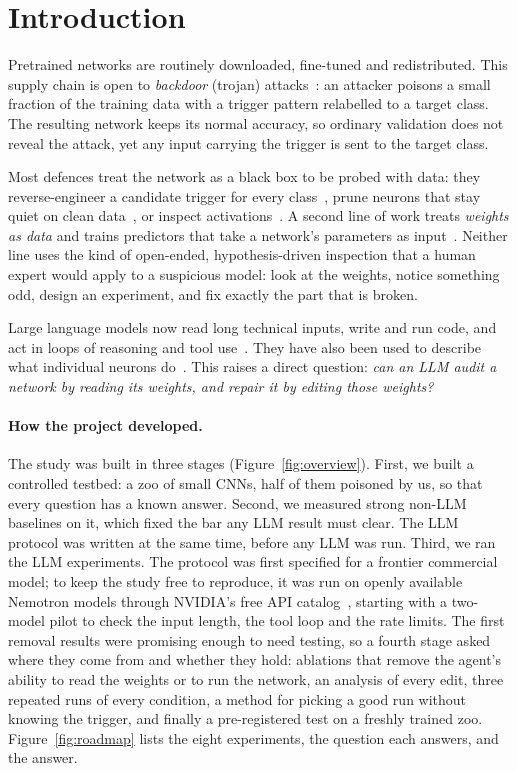 \documentclass[11pt]{article}
\begin{document}
\section{Introduction}
Pretrained networks are routinely downloaded, fine-tuned and redistributed. This supply chain is
open to \emph{backdoor} (trojan) attacks~\citep{gu2017badnets}: an attacker poisons a small fraction
of the training data with a trigger pattern relabelled to a target class. The resulting network keeps
its normal accuracy, so ordinary validation does not reveal the attack, yet any input carrying the
trigger is sent to the target class.

Most defences treat the network as a black box to be probed with data: they reverse-engineer a
candidate trigger for every class~\citep{wang2019neuralcleanse}, prune neurons that stay quiet on
clean data~\citep{liu2018fineprune}, or inspect activations~\citep{tran2018spectral}. A second line
of work treats \emph{weights as data} and trains predictors that take a network's parameters as
input~\citep{unterthiner2020predicting, schurholt2022modelzoos, navon2023equivariant, xu2021mntd}.
Neither line uses the kind of open-ended, hypothesis-driven inspection that a human expert would
apply to a suspicious model: look at the weights, notice something odd, design an experiment,
and fix exactly the part that is broken.

Large language models now read long technical inputs, write and run code, and act in loops of
reasoning and tool use~\citep{yao2023react, schick2023toolformer}. They have also been used to
describe what individual neurons do~\citep{bills2023explain}. This raises a direct question:
\emph{can an LLM audit a network by reading its weights, and repair it by editing those weights?}

\paragraph{How the project developed.} The study was built in three stages
(Figure~\ref{fig:overview}). First, we built a controlled testbed: a zoo of small CNNs, half of
them poisoned by us, so that every question has a known answer. Second, we measured strong
non-LLM baselines on it, which fixed the bar any LLM result must clear. The LLM protocol was written
at the same time, before any LLM was run. Third, we ran the LLM experiments. The protocol was
first specified for a frontier commercial model; to keep the study free to reproduce, it was run
on openly available Nemotron models through NVIDIA's free API catalog~\citep{nvidia2026catalog},
starting with a two-model pilot to check the input length, the tool loop and the rate limits.
The first removal results were promising enough to need testing, so a fourth stage asked where they
come from and whether they hold: ablations that remove the agent's ability to read the weights or to run
the network, an analysis of every edit, three repeated runs of every condition, a method for picking a
good run without knowing the trigger, and finally a pre-registered test on a freshly trained zoo.
Figure~\ref{fig:roadmap} lists the eight experiments, the question each answers, and the answer.
\end{document}

